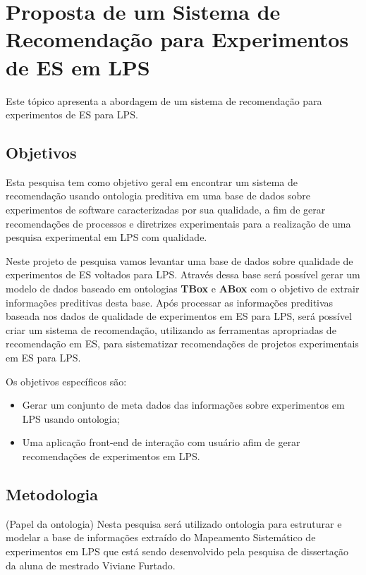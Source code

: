 \chapter{Proposta de um Sistema de Recomendação para Experimentos de ES em LPS}
\label{sec:prop_sis_rec_exp}

Este tópico apresenta a abordagem de um sistema de recomendação para experimentos de ES para LPS.

\section{Objetivos}
\label{sec:obj}

Esta pesquisa tem como objetivo geral em encontrar um sistema de recomendação usando ontologia preditiva em uma base de dados sobre experimentos de software caracterizadas por sua qualidade, a fim de gerar recomendações de processos e diretrizes experimentais para a realização de uma pesquisa experimental em LPS com qualidade.

Neste projeto de pesquisa vamos levantar uma base de dados sobre qualidade de experimentos de ES voltados para LPS. Através dessa base será possível gerar um modelo de dados baseado em ontologias \textbf{TBox} e \textbf{ABox} com o objetivo de extrair informações preditivas desta base. Após processar as informações preditivas baseada nos dados de qualidade de experimentos em ES para LPS, será possível criar um sistema de recomendação, utilizando as ferramentas apropriadas de recomendação em ES, para sistematizar recomendações de projetos experimentais em ES para LPS.

Os objetivos específicos são:

\begin{itemize}
	\item Gerar um conjunto de meta dados das informações sobre experimentos em LPS usando ontologia;
	\item Uma aplicação front-end de interação com usuário afim de gerar recomendações de experimentos em LPS.
\end{itemize}

\section{Metodologia}
\label{sec:meto}

(Papel da ontologia)
Nesta pesquisa será utilizado ontologia para estruturar e modelar a base de informações extraído do Mapeamento Sistemático de experimentos em LPS que está sendo desenvolvido pela pesquisa de dissertação da aluna de mestrado Viviane Furtado.

